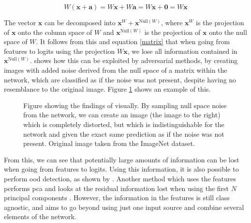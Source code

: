 \documentclass[UKenglish]{uiomasterthesis} %
\theoremstyle{definition}
\begin{document}
\begin{equation}
W (\bm{x} + \bm{a}) = W \bm{x} + W \bm{a} = W \bm{x} + \bm{0} = W \bm{x}
\label{matrix}
\end{equation}

\noindent The vector $\bm{x}$ can be decomposed into $\bm{x}^W + \bm{x}^{\text{Null}(W)}$, where $\bm{x}^W$ is the projection of $\bm{x}$ onto the column space of $W$ and $\bm{x}^{\text{Null}(W)}$ is the projection of $\bm{x}$ onto the null space of $W$. It follows from this and equation \ref{matrix} that when going from features to logits using the projection $W \bm{x}$, we lose all information contained in $\bm{x}^{\text{Null}(W)}$. \cite{nusa} shows how this can be exploited by adversarial methods, by creating images with added noise derived from the null space of a matrix within the network, which are classified as if the noise was not present, despite having no resemblance to the original image. Figure \ref{dog} shows an example of this.

\begin{figure}[hbtp]
    \begin{center}

    \caption{Figure showing the findings of \cite{nusa} visually. By sampling null space noise from the network, we can create an image (the image to the right) which is completely distorted, but which is indistinguishable for the network and given the exact same prediction as if the noise was not present. Original image taken from the ImageNet dataset.}
    \label{dog}
    \end{center}
\end{figure}


From this, we can see that potentially large amounts of information can be lost when going from features to logits. Using this information, it is also possible to perform \ac{ood} detection, as shown by \cite{nusa}. Another method which uses the features performs \ac{pca} and looks at the residual information lost when using the first $N$ principal components \cite{subspace}. However, the information in the features is still class agnostic, and \cite{vim} aims to go beyond using just one input source and combine several elements of the network.
\end{document}
